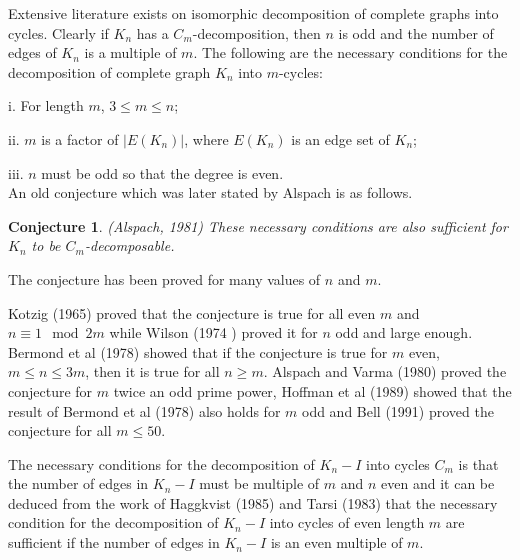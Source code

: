 \documentclass[12pt]{report}
\newtheorem{conj}[thm]{Conjecture}
\begin{document}
Extensive literature exists on isomorphic decomposition of complete
graphs into cycles. Clearly if $K_n$ has a $C_m$-decomposition, then
$n$ is odd and the number of edges of $K_n$ is a multiple of $m$.
The following are the necessary conditions for the decomposition of
complete graph $K_n$ into $m$-cycles:

i. For length $m$, $3\leq m\leq n $;

ii. $m$ is a factor of $\left|E(K_n)\right|$, where $E(K_n)$ is an
edge set of $K_n$;

iii. $n$ must be odd so that the degree is even.\\
An old conjecture which was later stated by Alspach is as follows.
\begin{conj} (Alspach, 1981) These necessary conditions are also sufficient for $K_n$ to be $C_m$-decomposable.
\end{conj}
The conjecture has been proved for many values of $n$ and $m$.

Kotzig (1965) %
 proved that the conjecture is true
for all even $m$ and $n\equiv 1 \mod 2m$ while  Wilson
(1974 )%
   \;proved it for %
   $n$ %
   odd and large
enough.
Bermond et al (1978) %
 showed that if the conjecture is true
for $m$ even, $m \leq n \leq 3m$,
 then it is true for all $n\geq m$.
Alspach and Varma  (1980) %
 proved the conjecture %
for $m$ twice an odd prime power,  Hoffman et al (1989) %
 showed that the result of Bermond  et al (1978) %
 also holds for $m$ odd
and Bell (1991) %
  proved the conjecture for all $m\leq 50$.

The necessary conditions for the decomposition of $K_n-I$ into
cycles $C_m$ is that the number of edges in $K_n-I$ must be multiple
of $m$ and $n$ even and
it can be deduced from the work of  Haggkvist (1985)\;%
 and Tarsi (1983) %
 that the  necessary condition for the decomposition of $K_n-I$ into cycles of even length $m$ are sufficient if the number of edges in $K_n-I$ is an even multiple of $m$.
\end{document}
